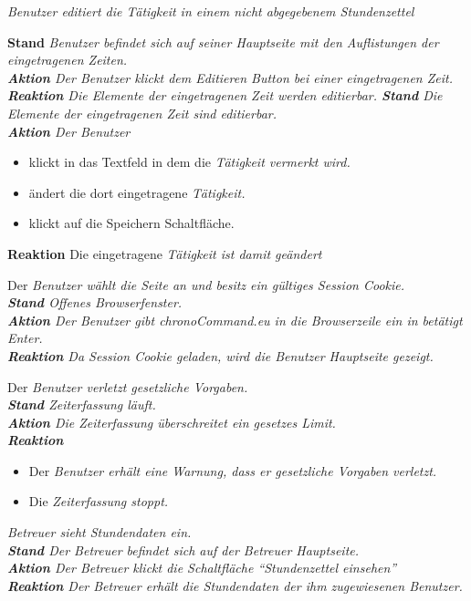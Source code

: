 \begin{requirements}
	 \em{Benutzer} editiert die \em{Tätigkeit} in einem \em{nicht abgegebenem} \em{Stundenzettel}
	\begin{requirements}
	        \textbf{Stand} \em{Benutzer} befindet sich auf seiner \em{Hauptseite} mit den Auflistungen der eingetragenen Zeiten. \\
	        \textbf{Aktion} Der \em{Benutzer} klickt dem Editieren Button bei einer eingetragenen Zeit.\\
            \textbf{Reaktion} Die Elemente der eingetragenen Zeit werden editierbar.
        \textbf{Stand} Die Elemente der eingetragenen Zeit sind editierbar. \\
        \textbf{Aktion} Der \em{Benutzer}
            \begin{itemize}
                \item klickt in das Textfeld in dem die \em{Tätigkeit} vermerkt wird.
                \item ändert die dort eingetragene \em{Tätigkeit}.
                \item klickt auf die Speichern Schaltfläche.
            \end{itemize}
            \textbf{Reaktion} Die eingetragene \em{Tätigkeit} ist damit geändert
    \end{requirements}

     Der \em{Benutzer} wählt die Seite an und besitz ein gültiges Session Cookie. \\
        \textbf{Stand} Offenes Browserfenster. \\
        \textbf{Aktion} Der \em{Benutzer} gibt chronoCommand.eu in die Browserzeile ein in betätigt Enter. \\
        \textbf{Reaktion} Da Session Cookie geladen, wird die \em{Benutzer Hauptseite} gezeigt.

     Der \em{Benutzer} verletzt gesetzliche Vorgaben. \\
        \textbf{Stand} \em{Zeiterfassung} läuft. \\
        \textbf{Aktion} Die \em{Zeiterfassung} überschreitet ein gesetzes Limit. \\
        \textbf{Reaktion}
            \begin{itemize}
                \item Der \em{Benutzer} erhält eine \em{Warnung}, dass er gesetzliche Vorgaben verletzt.
                \item Die \em{Zeiterfassung} stoppt.
            \end{itemize}

     \em{Betreuer} sieht \em{Stundendaten} ein. \\
        \textbf{Stand} Der \em{Betreuer} befindet sich auf der \em{Betreuer Hauptseite}. \\
        \textbf{Aktion} Der \em{Betreuer} klickt die Schaltfläche "`Stundenzettel einsehen"' \\
        \textbf{Reaktion} Der \em{Betreuer} erhält die \em{Stundendaten} der ihm zugewiesenen \em{Benutzer}.

\end{requirements}

